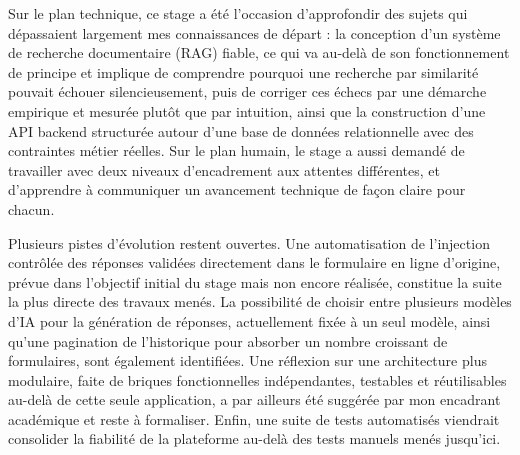 \documentclass[12pt,a4paper]{report}
\begin{document}
Sur le plan technique, ce stage a été l'occasion d'approfondir des
sujets qui dépassaient largement mes connaissances de départ : la
conception d'un système de recherche documentaire (RAG) fiable, ce qui
va au-delà de son fonctionnement de principe et implique de comprendre
pourquoi une recherche par similarité pouvait échouer silencieusement,
puis de corriger ces échecs par une démarche empirique et mesurée
plutôt que par intuition, ainsi que la construction d'une API backend structurée
autour d'une base de données relationnelle avec des contraintes
métier réelles. Sur le plan humain, le stage a aussi demandé de
travailler avec deux niveaux d'encadrement aux attentes différentes, et
d'apprendre à communiquer un avancement technique de façon claire pour
chacun.

Plusieurs pistes d'évolution restent ouvertes. Une automatisation de
l'injection contrôlée des réponses validées directement dans le
formulaire en ligne d'origine, prévue dans l'objectif initial du stage
mais non encore réalisée, constitue la suite la plus directe des
travaux menés. La possibilité de choisir entre plusieurs modèles d'IA
pour la génération de réponses, actuellement fixée à un seul modèle,
ainsi qu'une pagination de l'historique pour absorber un nombre
croissant de formulaires, sont également identifiées. Une réflexion sur
une architecture plus modulaire, faite de briques fonctionnelles
indépendantes, testables et réutilisables au-delà de cette seule
application, a par ailleurs été suggérée par mon encadrant académique
et reste à formaliser. Enfin, une suite de tests automatisés
viendrait consolider la fiabilité de la plateforme au-delà des tests
manuels menés jusqu'ici.
\end{document}
